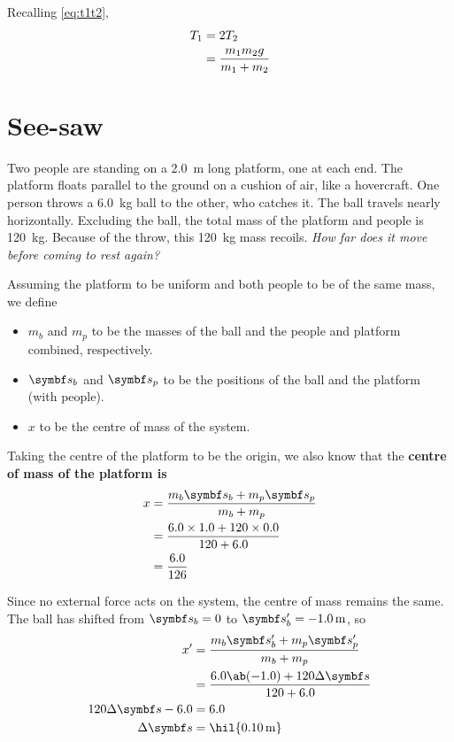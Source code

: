 Recalling \cref{eq:t1t2},
\begin{align*}
  T_1 &= 2T_2 \\
  &= \frac{m_1m_2g}{m_1+m_2}
\end{align*}

\section{See-saw}
Two people are standing on a \qty{2.0}{\metre} long platform, one at
each end. The platform floats parallel
to the ground on a cushion of air, like a hovercraft. One person
throws a \qty{6.0}{\kg} ball
to the other, who catches it. The ball travels nearly horizontally.
Excluding the ball, the total mass of the platform and people is \qty{120}{\kg}.
Because of the throw, this \qty{120}{\kg} mass recoils. \it{How far
does it move before coming to rest again?}

Assuming the platform to be uniform and both people to be of the same
mass, we define
\begin{itemize}
  \item \(m_b\) and \(m_p\) to be the masses of the ball and the
    people and platform combined, respectively.
  \item \(\mv{s}_b\) and \(\mv{s}_p\) to be the positions of the ball
    and the platform (with people).
  \item \(x\) to be the centre of mass of the system.
\end{itemize}

Taking the centre of the platform to be the origin,
we also know that the \bf{centre of mass} of the platform is
\begin{align*}
  x &= \f{m_b \mv{s}_b + m_p \mv{s}_p}{m_b + m_p} \\
  &= \f{6.0 \times 1.0 + 120 \times 0.0}{120 + 6.0} \\
  &= \f{6.0}{126}
\end{align*}

Since no external force acts on the system, the centre of mass remains the same.
The ball has shifted from \(\mv{s}_b = 0\) to \(\mv{s}_b' =
\qty{-1.0}{\metre}\), so
\begin{align*}
  x' &= \f{m_b \mv{s}_b' + m_p \mv{s}_p'}{m_b + m_p} \\
  &= \f{6.0\ab(-1.0) + 120\Delta\mv{s}}{120 + 6.0} \\
  120\Delta\mv{s} - 6.0 &= 6.0 \\
  \Delta\mv{s} &= \hil{\qty{+0.10}{\metre}}
\end{align*}

